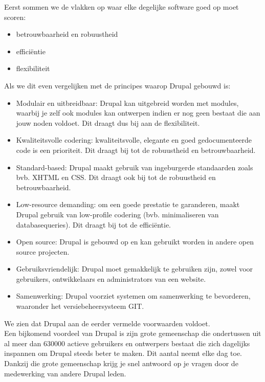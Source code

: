 Eerst sommen we de vlakken op waar elke degelijke software goed op moet scoren:
\begin{itemize}
\item betrouwbaarheid en robuustheid
\item effici\"{e}ntie
\item flexibiliteit
\end{itemize}
Als we dit even vergelijken met de principes waarop Drupal gebouwd is:
\begin{itemize}
\item Modulair en uitbreidbaar: Drupal kan uitgebreid worden met modules, waarbij je zelf ook modules kan ontwerpen indien er nog geen bestaat die aan jouw noden voldoet. Dit draagt dus bij aan de flexibiliteit.
\item Kwaliteitsvolle codering: kwaliteitsvolle, elegante en goed gedocumenteerde code is een prioriteit. Dit draagt bij tot de robuustheid en betrouwbaarheid.
\item Standard-based: Drupal maakt gebruik van ingeburgerde standaarden zoals bvb. XHTML en CSS. Dit draagt ook bij tot de robuustheid en betrouwbaarheid.
\item Low-resource demanding: om een goede prestatie te garanderen, maakt Drupal gebruik van low-profile codering (bvb. minimaliseren van databasequeries). Dit draagt bij tot de effici\"{e}ntie.
\item Open source: Drupal is gebouwd op en kan gebruikt worden in andere open source projecten.
\item Gebruiksvriendelijk: Drupal moet gemakkelijk te gebruiken zijn, zowel voor gebruikers, ontwikkelaars en administrators van een website.
\item Samenwerking: Drupal voorziet systemen om samenwerking te bevorderen, waaronder het versiebeheersysteem GIT.
\end{itemize}
We zien dat Drupal aan de eerder vermelde voorwaarden voldoet.\\

Een bijkomend voordeel van Drupal is zijn grote gemeenschap die ondertussen uit al meer dan 630000 actieve gebruikers en ontwerpers bestaat die zich dagelijks inspannen om Drupal steeds beter te maken. Dit aantal neemt elke dag toe. Dankzij die grote gemeenschap krijg je snel antwoord op je vragen door de medewerking van andere Drupal leden.\\

